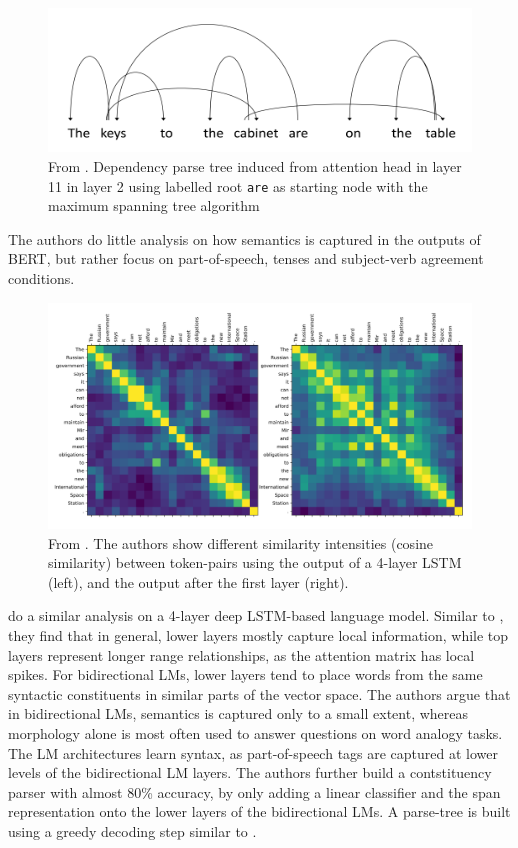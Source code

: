 \documentclass[a4paper,12pt,oneside,openright]{report}
\begin{document}
\begin{figure}
	\center
  \includegraphics[width=0.7\linewidth]{./assets/relatedwork/BERT_dependency_parsing.png}
  \caption{From \cite{jawahar19}. Dependency parse tree induced from attention head in layer 11 in layer 2 using labelled root \texttt{are} as starting node with the maximum spanning tree algorithm}
  \label{fig:cold_fictional_desired}
\end{figure}

The authors do little analysis on how semantics is captured in the outputs of BERT, but rather focus on part-of-speech, tenses and subject-verb agreement conditions. \\

\begin{figure}
	\center
  \includegraphics[width=0.9\linewidth]{./assets/relatedwork/self_attention_analysis.png}
  \caption{From \cite{peters18}. The authors show different similarity intensities (cosine similarity) between token-pairs using the output of a 4-layer LSTM (left), and the output after the first layer (right).}
  \label{fig:embeddings_by_language}
\end{figure}

\cite{peters18} do a similar analysis on a 4-layer deep LSTM-based language model. 
Similar to \cite{jawahar19}, they find that in general, lower layers mostly capture local information, while top layers represent longer range relationships, as the attention matrix has local spikes.
For bidirectional LMs, lower layers tend to place words from the same syntactic constituents in similar parts of the vector space.
The authors argue that in bidirectional LMs, semantics is captured only to a small extent, whereas morphology alone is most often used to answer questions on word analogy tasks.
The LM architectures learn syntax, as part-of-speech tags are captured at lower levels of the bidirectional LM layers.
The authors further build a contstituency parser with almost 80\% accuracy, by only adding a linear classifier and the span representation onto the lower layers of the bidirectional LMs.
A parse-tree is built using a greedy decoding step similar to \cite{joshi19b}. \\
 
\end{document}
